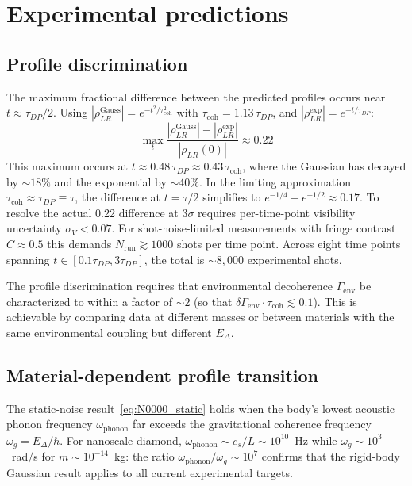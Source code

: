 \documentclass[12pt,a4paper]{article}
\begin{document}
\section{Experimental predictions}
\label{sec:predictions}

\subsection{Profile discrimination}

The maximum fractional difference between the predicted profiles occurs near
$t \approx \tau_{DP}/2$. Using $|\rho_{LR}^{\text{Gauss}}| = e^{-t^2/\tau_{\text{coh}}^2}$
with $\tau_{\text{coh}} = 1.13\,\tau_{DP}$, and
$|\rho_{LR}^{\text{exp}}| = e^{-t/\tau_{DP}}$:
\begin{equation}
\max_t\frac{|\rho_{LR}^{\text{Gauss}}| - |\rho_{LR}^{\text{exp}}|}{|\rho_{LR}(0)|}
\approx 0.22
\label{eq:delta_V}
\end{equation}
This maximum occurs at $t \approx 0.48\,\tau_{DP} \approx 0.43\,\tau_{\text{coh}}$,
where the Gaussian has decayed by $\sim18\%$ and the exponential by $\sim40\%$.
In the limiting approximation $\tau_{\text{coh}} \approx \tau_{DP} \equiv \tau$,
the difference at $t = \tau/2$ simplifies to $e^{-1/4} - e^{-1/2} \approx 0.17$.
To resolve the actual 0.22 difference at $3\sigma$ requires per-time-point visibility
uncertainty $\sigma_V < 0.07$. For shot-noise-limited measurements with fringe contrast
$C \approx 0.5$ this demands $N_{\text{run}} \gtrsim 1000$ shots per time point. Across
eight time points spanning $t \in [0.1\tau_{DP}, 3\tau_{DP}]$, the total is
$\sim 8{,}000$ experimental shots.

The profile discrimination requires that environmental decoherence $\Gamma_{\text{env}}$
be characterized to within a factor of $\sim 2$ (so that $\delta\Gamma_{\text{env}}\cdot
\tau_{\text{coh}} \lesssim 0.1$). This is achievable by comparing data at different masses
or between materials with the same environmental coupling but different $E_\Delta$.

\subsection{Material-dependent profile transition}
\label{sec:material}

The static-noise result~\eqref{eq:N0000_static} holds when the body's lowest acoustic
phonon frequency $\omega_{\text{phonon}}$ far exceeds the gravitational coherence frequency
$\omega_g = E_\Delta/\hbar$. For nanoscale diamond, $\omega_{\text{phonon}} \sim c_s/L
\sim 10^{10}$~Hz while $\omega_g \sim 10^3$~rad/s for $m \sim 10^{-14}$~kg: the ratio
$\omega_{\text{phonon}}/\omega_g \sim 10^7$ confirms that the rigid-body Gaussian result
applies to all current experimental targets.
\end{document}
